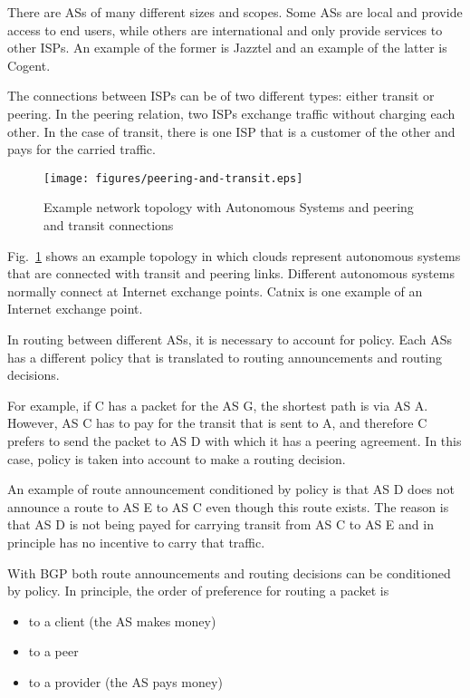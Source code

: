 There are ASs of many different sizes and scopes.
Some ASs are local and provide access to end users, while others are international and only provide services to other ISPs.
An example of the former is Jazztel and an example of the latter is Cogent.

The connections between ISPs can be of two different types: either transit or peering.
In the peering relation, two ISPs exchange traffic without charging each other.
In the case of transit, there is one ISP that is a customer of the other and pays for the carried traffic.

\begin{figure}[!h]
\centering
\texttt{[image: figures/peering-and-transit.eps]}
\caption{Example network topology with Autonomous Systems and peering and transit connections}
\label{fig:peering-and-transit}
\end{figure}

Fig.~\ref{fig:peering-and-transit} shows an example topology in which clouds represent autonomous systems that are connected with transit and peering links.
Different autonomous systems normally connect at Internet exchange points. 
Catnix is one example of an Internet exchange point.

In routing between different ASs, it is necessary to account for policy.
Each ASs has a different policy that is translated to routing announcements and routing decisions. 

For example, if C has a packet for the AS G, the shortest path is via AS A.
However, AS C has to pay for the transit that is sent to A, and therefore C prefers to send the packet to AS D with which it has a peering agreement.
In this case, policy is taken into account to make a routing decision.

An example of route announcement conditioned by policy is that AS D does not announce a route to AS E to AS C even though this route exists.
The reason is that AS D is not being payed for carrying transit from AS C to AS E and in principle has no incentive to carry that traffic.

With BGP both route announcements and routing decisions can be conditioned by policy.
In principle, the order of preference for routing a packet is 
\begin{itemize}
\item to a client (the AS makes money)
\item to a peer
\item to a provider (the AS pays money)
\end{itemize}

